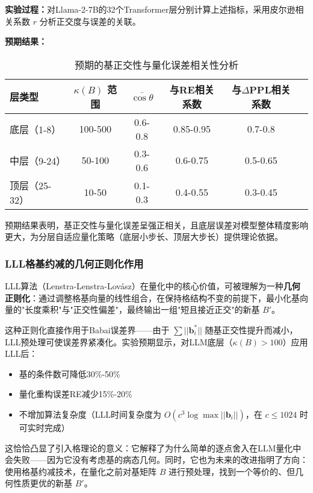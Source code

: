 \documentclass[letterpaper,twocolumn,10pt]{article}
\begin{document}
\textbf{实验过程：}对Llama-2-7B的32个Transformer层分别计算上述指标，采用皮尔逊相关系数 $r$ 分析正交度与误差的关联。

\textbf{预期结果：}

\begin{table*}[t]
\centering
\small
\begin{tabular}{lccccc}
\toprule
\textbf{层类型} & \textbf{$\kappa(B)$ 范围} & \textbf{$\bar{\cos\theta}$} & \textbf{与RE相关系数} & \textbf{与$\Delta$PPL相关系数} \\
\midrule
底层（1-8） & 100-500 & 0.6-0.8 & 0.85-0.95 & 0.7-0.8 \\
中层（9-24） & 50-100 & 0.3-0.6 & 0.6-0.75 & 0.5-0.65 \\
顶层（25-32） & 10-50 & 0.1-0.3 & 0.4-0.55 & 0.3-0.45 \\
\bottomrule
\end{tabular}
\caption{预期的基正交性与量化误差相关性分析}
\label{tab:orthogonality-correlation}
\end{table*}

预期结果表明，基正交性与量化误差呈强正相关，且底层误差对模型整体精度影响更大，为分层自适应量化策略（底层小步长、顶层大步长）提供理论依据。

\subsubsection{LLL格基约减的几何正则化作用}

LLL算法（Lenstra-Lenstra-Lovász）在量化中的核心价值，可被理解为一种\textbf{几何正则化}：通过调整格基向量的线性组合，在保持格结构不变的前提下，最小化基向量的"长度乘积"与"正交性偏差"，最终输出一组"短且接近正交"的新基 $B'$。

这种正则化直接作用于Babai误差界——由于 $\sum ||\mathbf{b}_i^*||$ 随基正交性提升而减小，LLL预处理可使误差界紧凑化。实验预期显示，对LLM底层（$\kappa(B) > 100$）应用LLL后：
\begin{itemize}
\item 基的条件数可降低30\%-50\%
\item 量化重构误差RE减少15\%-20\%
\item 不增加算法复杂度（LLL时间复杂度为 $O(c^3 \log \max ||\mathbf{b}_i||)$，在 $c \leq 1024$ 时可实时完成）
\end{itemize}

这恰恰凸显了引入格理论的意义：它解释了为什么简单的逐点舍入在LLM量化中会失败——因为它没有考虑基的病态几何。同时，它也为未来的改进指明了方向：使用格基约减技术，在量化之前对基矩阵 $B$ 进行预处理，找到一个等价的、但几何性质更优的新基 $B'$。
\end{document}

